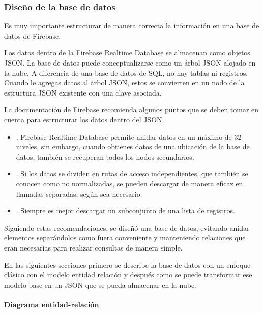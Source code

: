 \subsubsection{Diseño de la base de datos}
\label{\detokenize{chapter_two/desc_cloudnao:diseno-de-la-base-de-datos}}
Es muy importante estructurar de manera correcta la información en una base
de datos de Firebase.

Los datos dentro de la Firebase Realtime Database se almacenan como objetos
JSON. La base de datos puede conceptualizarse como un árbol JSON alojado en la
nube. A diferencia de una base de datos de SQL, no hay tablas ni registros.
Cuando le agregas datos al árbol JSON, estos se convierten en un nodo de la
estructura JSON existente con una clave asociada.

La documentación de Firebase recomienda algunos puntos que se deben tomar
en cuenta para estructurar los datos dentro del JSON.
\begin{itemize}
\item {} 
. Firebase Realtime Database permite anidar datos en un máximo de 32 niveles, sin embargo, cuando obtienes datos de una ubicación de la base de datos, también se recuperan todos los nodos secundarios.

\item {} 
. Si los datos se dividen en rutas de acceso independientes, que también se conocen como no normalizadas, se pueden descargar de manera eficaz en llamadas separadas, según sea necesario.

\item {} 
. Siempre es mejor descargar un subconjunto de una lista de registros.

\end{itemize}

Siguiendo estas recomendaciones, se diseñó una base de datos, evitando anidar
elementos separándolos como fuera conveniente y manteniendo relaciones que
eran necesarias para realizar consultas de manera simple.

En las siguientes secciones primero se describe la base de datos con un enfoque
clásico con el modelo entidad relación y después como se puede transformar ese
modelo base en un JSON que se pueda almacenar en la nube.

\paragraph{Diagrama entidad-relación}


